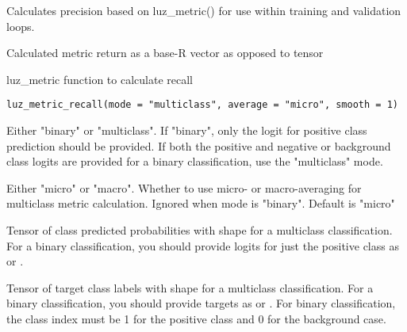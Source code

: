 \documentclass[a4paper]{book}
\begin{document}
%
\begin{Details}\relax
Calculates precision based on luz\_metric() for use within training and validation
loops.
\end{Details}
%
\begin{Value}
Calculated metric return as a base-R vector as opposed to tensor
\end{Value}
%
\begin{Description}\relax
luz\_metric function to calculate recall
\end{Description}
%
\begin{Usage}
\begin{verbatim}
luz_metric_recall(mode = "multiclass", average = "micro", smooth = 1)
\end{verbatim}
\end{Usage}
%
\begin{Arguments}
\begin{ldescription}
\item[\code{mode}] Either "binary" or "multiclass". If "binary", only the logit for
positive class prediction should be provided. If both the positive and negative
or background class logits are provided for a binary classification, use
the "multiclass" mode.

\item[\code{average}] Either "micro" or "macro". Whether to use micro- or macro-averaging
for multiclass metric calculation. Ignored when mode is "binary". Default is
"micro"

\item[\code{preds}] Tensor of class predicted probabilities with shape
 for a multiclass classification. For a
binary classification, you should provide logits for just the positive class as
 or .

\item[\code{target}] Tensor of target class labels with shape
 for a multiclass classification. For a
binary classification, you should provide targets as
 or . For
binary classification, the class index must be 1 for the positive class and 0 for the
background case.
\end{ldescription}
\end{Arguments}
\end{document}
